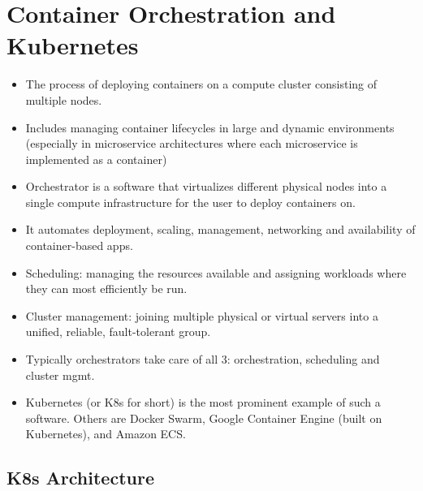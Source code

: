 \documentclass{article}
\begin{document}
\section{Container Orchestration and Kubernetes}
\begin{itemize}

    \item The process of deploying containers on a compute cluster consisting of multiple nodes.
    \item Includes managing container lifecycles in large and dynamic environments (especially in microservice architectures where each microservice is implemented as a container) 
    
    \item Orchestrator is a software that virtualizes different physical nodes into a single compute infrastructure for the user to deploy containers on.
    
    \item It automates deployment, scaling, management, networking and availability of container-based apps. 
    
    \item Scheduling: managing the resources available and assigning workloads where they can most efficiently be run. 
    
    \item Cluster management: joining multiple physical or virtual servers into a unified, reliable, fault-tolerant group.
    
    \item Typically orchestrators take care of all 3: orchestration, scheduling and cluster mgmt. 
    
    \item Kubernetes (or K8s for short) is the most prominent example of such a software. Others are Docker Swarm, Google Container Engine (built on Kubernetes), and Amazon ECS.
\end{itemize}

\subsection{K8s Architecture}
\end{document}

